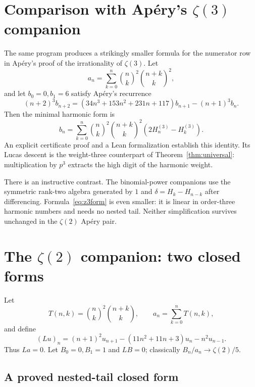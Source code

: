 \documentclass[11pt,reqno]{amsart}
\theoremstyle{definition}
\theoremstyle{remark}
\newcommand{\bin}[2]{\binom{#1}{#2}}
\begin{document}
\section{Comparison with Ap\'ery's \texorpdfstring{$\zeta(3)$}{zeta(3)} companion}

The same program produces a strikingly smaller formula for the numerator row
in Ap\'ery's proof of the irrationality of $\zeta(3)$.  Let
\[
 a_n=\sum_{k=0}^n\bin nk^2\bin{n+k}k^2,
\]
and let $b_0=0,b_1=6$ satisfy Ap\'ery's recurrence
\begin{equation}\label{eq:z3rec}
 (n+2)^3b_{n+2}=(34n^3+153n^2+231n+117)b_{n+1}-(n+1)^3b_n.
\end{equation}
Then the minimal harmonic form is
\begin{equation}\label{eq:z3form}
 b_n=\sum_{k=0}^n\bin nk^2\bin{n+k}k^2
       \left(2H_n^{(3)}-H_k^{(3)}\right).
\end{equation}
An explicit certificate proof and a Lean formalization establish this identity.
Its Lucas descent is the weight-three counterpart of
Theorem~\ref{thm:universal}: multiplication by $p^3$ extracts the high digit of
the harmonic weight.

There is an instructive contrast.  The binomial-power companions use the
symmetric rank-two algebra generated by $1$ and
$\delta=H_k-H_{n-k}$ after differencing.  Formula~\eqref{eq:z3form} is even
smaller: it is linear in order-three harmonic numbers and needs no nested tail.
Neither simplification survives unchanged in the $\zeta(2)$ Ap\'ery pair.

\section{The \texorpdfstring{$\zeta(2)$}{zeta(2)} companion: two closed forms}\label{sec:z2}

Let
\begin{equation}\label{eq:z2kernel}
 T(n,k)=\bin nk^2\bin{n+k}k,\qquad a_n=\sum_{k=0}^nT(n,k),
\end{equation}
and define
\begin{equation}\label{eq:z2op}
 (Lu)_n=(n+1)^2u_{n+1}-(11n^2+11n+3)u_n-n^2u_{n-1}.
\end{equation}
Thus $La=0$.  Let $B_0=0,B_1=1$ and $LB=0$; classically
$B_n/a_n\to\zeta(2)/5$.

\subsection{A proved nested-tail closed form}
\end{document}
